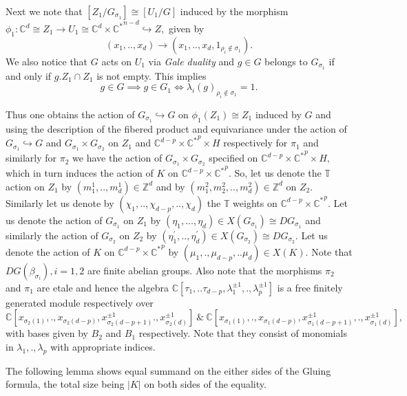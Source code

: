 \documentclass[10pt]{amsart}
\numberwithin{equation}{subsection}
\begin{document}
Next we note that $[Z_1/G_{\sigma_1}]\cong [U_1/G]$ induced by the morphism $\phi_1:\mathbb{C}^d \cong Z_1\rightarrow U_1\cong \mathbb{C}^d\times \mathbb{C^*}^{n-d}\hookrightarrow Z,$ given by $$(x_1,..,x_d)\rightarrow (x_1,..,x_d,1_{\rho_i\notin \sigma_1}).$$ We also notice that $G$ acts on $U_1$ via \textit {Gale duality} and $g\in G$ belongs to $G_{\sigma_{1}}$ if and only if $g.Z_1 \cap Z_1$ is not empty. This implies $$g\in G\implies g\in G_1 \iff \lambda_i(g)_{\rho_i\notin \sigma_1}=1.$$\par Thus one obtains the action of $G_{\sigma_1}\hookrightarrow G$ on $\phi_1(Z_1)\cong Z_1$ induced by $G$ and using the description of the fibered product and equivariance under the action of $G_{\sigma_1}\hookrightarrow G$ and $G_{\sigma_1}\times G_{\sigma_2}$ on $Z_1$ and $\mathbb{C}^{d-p}\times \mathbb{C^*}^{p}\times H$ respectively for $\pi_1$ and similarly for $\pi_2$ we have the action of $G_{\sigma_1}\times G_{\sigma_2}$ specified on $\mathbb{C}^{d-p}\times \mathbb{C^*}^{p}\times H,$ which in turn induces the action of $K$ on $\mathbb{C}^{d-p}\times \mathbb{C^*}^{p}.$ So, let us denote the $\mathbb{T}$ action on $Z_1$ by $(m^1_1,..,m^1_d)\in \mathbb{Z}^d$ and by $(m_1^{2},m_2^{2},..,m_d^{2})\in \mathbb{Z}^d$ on $Z_2.$ Similarly let us denote by $(\chi_1,..,\chi_{d-p},..,\chi_{d})$ the $\mathbb{T}$ weights on $\mathbb{C}^{d-p}\times \mathbb{C^*}^{p}.$ Let us denote the action of $G_{\sigma_{1}}$ on $Z_1$ by $(\eta_1,...,\eta_d)\in X(G_{\sigma_1})\cong DG_{\sigma_1}$ and similarly the action of $G_{\sigma_2}$ on $Z_2$ by $(\eta_1^{'},..,\eta_d^{'})\in X(G_{\sigma_{2}})\cong DG_{\sigma_2}$. Let us denote the action of $K$ on $\mathbb{C}^{d-p}\times \mathbb{C^*}^{p}$ by $(\mu_{1},.,\mu_{d-p},..\mu_{d})\in X(K).$ Note that $DG(\beta_{\sigma_i}),i=1,2$ are finite abelian groups. Also note that the morphisms $\pi_2$ and $\pi_1$ are etale and hence the algebra $\mathbb{C}[\tau_1,..\tau_{d-p},\lambda_{1}^{\pm 1},.,\lambda_{p}^{\pm 1}]$ is a free finitely generated module respectively over $$\mathbb{C}[x_{\sigma_{2}(1)},. ,x_{\sigma_{2}(d-p)},x_{\sigma_{2}(d-p+1)}^{\pm 1}.,x_{\sigma_{2}(d)}^{\pm 1}] \ \& \ \mathbb{C}[x_{\sigma_{1}(1)},.,x_{\sigma_{1}(d-p)},x_{\sigma_{1}(d-p+1)}^{\pm 1},.,x_{\sigma_{1}(d)}^{\pm 1}],$$ with bases given by $B_2$ and $B_1$ respectively. Note that they consist of monomials in $\lambda_1,.,\lambda_p$ with appropriate indices.\par
The following lemma shows equal summand on the either sides of the Gluing formula, the total size being $|K|$ on both sides of the equality.
\end{document}
